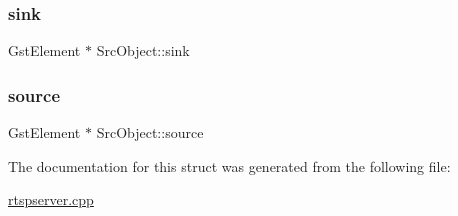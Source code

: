 \subsubsection{\texorpdfstring{sink}{sink}}
{\footnotesize\ttfamily Gst\+Element $\ast$ Src\+Object\+::sink}

\mbox{\label{structSrcObject_a255996ef7f6136eec675a4801de19594}} 
\subsubsection{\texorpdfstring{source}{source}}
{\footnotesize\ttfamily Gst\+Element $\ast$ Src\+Object\+::source}



The documentation for this struct was generated from the following file\+:\begin{DoxyCompactItemize}
\item 
\mbox{\hyperlink{rtspserver_8cpp}{rtspserver.\+cpp}}\end{DoxyCompactItemize}
